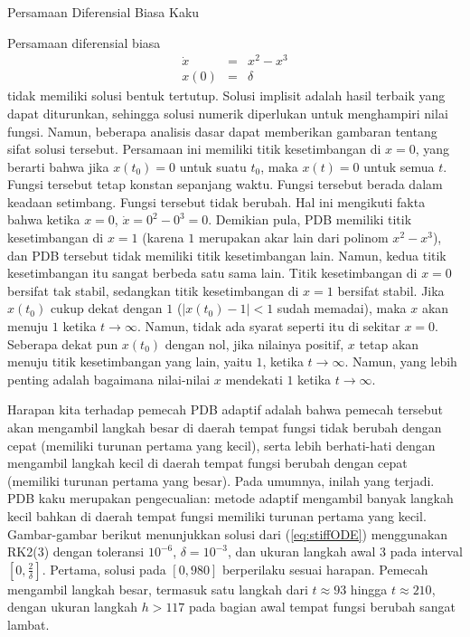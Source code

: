 \noindent\begin{digression}{Persamaan Diferensial Biasa Kaku}

\noindent Persamaan diferensial biasa
\begin{eqnarray}
\dot{x} & = & x^{2}-x^{3}\nonumber \\
x(0) & = & \delta\label{eq:stiffODE}
\end{eqnarray}
tidak memiliki solusi bentuk tertutup. Solusi implisit adalah hasil
terbaik yang dapat diturunkan, sehingga solusi numerik diperlukan
untuk menghampiri nilai fungsi. Namun, beberapa analisis dasar dapat
memberikan gambaran tentang sifat solusi tersebut. Persamaan ini memiliki
titik kesetimbangan di $x=0$, yang berarti bahwa jika $x(t_{0})=0$
untuk suatu $t_{0}$, maka $x(t)=0$ untuk semua $t$. Fungsi tersebut
tetap konstan sepanjang waktu. Fungsi tersebut berada dalam keadaan
setimbang. Fungsi tersebut tidak berubah. Hal ini mengikuti fakta
bahwa ketika $x=0$, $\dot{x}=0^{2}-0^{3}=0$. Demikian pula, PDB
memiliki titik kesetimbangan di $x=1$ (karena $1$ merupakan akar
lain dari polinom $x^{2}-x^{3}$), dan PDB tersebut tidak memiliki
titik kesetimbangan lain. Namun, kedua titik kesetimbangan itu sangat
berbeda satu sama lain. Titik kesetimbangan di $x=0$ bersifat tak
stabil, sedangkan titik kesetimbangan di $x=1$ bersifat stabil. Jika
$x(t_{0})$ cukup dekat dengan $1$ ($|x(t_{0})-1|<1$ sudah memadai),
maka $x$ akan menuju $1$ ketika $t\to\infty$. Namun, tidak ada
syarat seperti itu di sekitar $x=0$. Seberapa dekat pun $x(t_{0})$
dengan nol, jika nilainya positif, $x$ tetap akan menuju titik kesetimbangan
yang lain, yaitu $1$, ketika $t\to\infty$. Namun, yang lebih penting
adalah bagaimana nilai-nilai $x$ mendekati $1$ ketika $t\to\infty$. 

Harapan kita terhadap pemecah PDB adaptif adalah bahwa pemecah tersebut
akan mengambil langkah besar di daerah tempat fungsi tidak berubah
dengan cepat (memiliki turunan pertama yang kecil), serta lebih berhati-hati
dengan mengambil langkah kecil di daerah tempat fungsi berubah dengan
cepat (memiliki turunan pertama yang besar). Pada umumnya, inilah
yang terjadi. PDB kaku merupakan pengecualian: metode adaptif mengambil
banyak langkah kecil bahkan di daerah tempat fungsi memiliki turunan
pertama yang kecil. Gambar-gambar berikut menunjukkan solusi dari
(\ref{eq:stiffODE}) menggunakan RK2(3) dengan toleransi $10^{-6}$,
$\delta=10^{-3}$, dan ukuran langkah awal $3$ pada interval $[0,\frac{2}{\delta}]$.
Pertama, solusi pada $[0,980]$ berperilaku sesuai harapan. Pemecah
mengambil langkah besar, termasuk satu langkah dari $t\approx93$
hingga $t\approx210$, dengan ukuran langkah $h>117$ pada bagian
awal tempat fungsi berubah sangat lambat. 


\end{digression}
